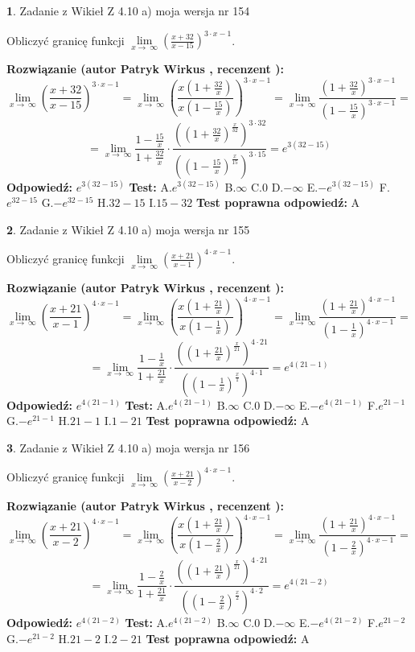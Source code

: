\documentclass[12pt, a4paper]{article}
\theoremstyle{definition} %
\newtheorem{zad}{}
\newcommand{\zadStart}[1]{\begin{zad}#1\newline}
\newcommand{\zadStop}{\end{zad}}
\newcommand{\rozwStart}[2]{\noindent \textbf{Rozwiązanie (autor #1 , recenzent #2): }\newline}
\newcommand{\rozwStop}{\newline}
\newcommand{\odpStart}{\noindent \textbf{Odpowiedź:}\newline}
\newcommand{\odpStop}{\newline}
\newcommand{\testStart}{\noindent \textbf{Test:}\newline}
\newcommand{\testStop}{\newline}
\newcommand{\kluczStart}{\noindent \textbf{Test poprawna odpowiedź:}\newline}
\newcommand{\kluczStop}{\newline}
\begin{document}
\zadStart{Zadanie z Wikieł Z 4.10 a) moja wersja nr 154}


Obliczyć granicę funkcji  $\lim\limits_{x\to\ \infty}(\frac{x+32}{x-15})^{3\cdot x-1}$.
\zadStop
\rozwStart{Patryk Wirkus}{}
$$\lim\limits_{x\to\ \infty}(\frac{x+32}{x-15})^{3\cdot x-1} = \lim\limits_{x\to\ \infty}(\frac{x(1+\frac{32}{x})}{x(1-\frac{15}{x})})^{3\cdot x-1}=\lim\limits_{x\to\ \infty}\frac{(1+\frac{32}{x})^{3\cdot x-1}}{(1-\frac{15}{x})^{3\cdot x-1}}=$$
$$=\lim\limits_{x\to\ \infty}\frac{1-\frac{15}{x}}{1+\frac{32}{x}}\cdot\frac{((1+\frac{32}{x})^{\frac{x}{32}})^{3\cdot32}}{((1-\frac{15}{x})^{\frac{x}{15}})^{3\cdot15}}=e^{3(32-15)}$$
\rozwStop
\odpStart
$e^{3(32-15)}$
\odpStop
\testStart
A.$e^{3(32-15)}$ B.$\infty$ C.$0$ D.$-\infty$ E.$-e^{3(32-15)}$
F.$e^{32-15}$ G.$-e^{32-15}$
H.$32-15$
I.$15-32$
\testStop
\kluczStart
A
\kluczStop



\zadStart{Zadanie z Wikieł Z 4.10 a) moja wersja nr 155}


Obliczyć granicę funkcji  $\lim\limits_{x\to\ \infty}(\frac{x+21}{x-1})^{4\cdot x-1}$.
\zadStop
\rozwStart{Patryk Wirkus}{}
$$\lim\limits_{x\to\ \infty}(\frac{x+21}{x-1})^{4\cdot x-1} = \lim\limits_{x\to\ \infty}(\frac{x(1+\frac{21}{x})}{x(1-\frac{1}{x})})^{4\cdot x-1}=\lim\limits_{x\to\ \infty}\frac{(1+\frac{21}{x})^{4\cdot x-1}}{(1-\frac{1}{x})^{4\cdot x-1}}=$$
$$=\lim\limits_{x\to\ \infty}\frac{1-\frac{1}{x}}{1+\frac{21}{x}}\cdot\frac{((1+\frac{21}{x})^{\frac{x}{21}})^{4\cdot21}}{((1-\frac{1}{x})^{\frac{x}{1}})^{4\cdot1}}=e^{4(21-1)}$$
\rozwStop
\odpStart
$e^{4(21-1)}$
\odpStop
\testStart
A.$e^{4(21-1)}$ B.$\infty$ C.$0$ D.$-\infty$ E.$-e^{4(21-1)}$
F.$e^{21-1}$ G.$-e^{21-1}$
H.$21-1$
I.$1-21$
\testStop
\kluczStart
A
\kluczStop



\zadStart{Zadanie z Wikieł Z 4.10 a) moja wersja nr 156}


Obliczyć granicę funkcji  $\lim\limits_{x\to\ \infty}(\frac{x+21}{x-2})^{4\cdot x-1}$.
\zadStop
\rozwStart{Patryk Wirkus}{}
$$\lim\limits_{x\to\ \infty}(\frac{x+21}{x-2})^{4\cdot x-1} = \lim\limits_{x\to\ \infty}(\frac{x(1+\frac{21}{x})}{x(1-\frac{2}{x})})^{4\cdot x-1}=\lim\limits_{x\to\ \infty}\frac{(1+\frac{21}{x})^{4\cdot x-1}}{(1-\frac{2}{x})^{4\cdot x-1}}=$$
$$=\lim\limits_{x\to\ \infty}\frac{1-\frac{2}{x}}{1+\frac{21}{x}}\cdot\frac{((1+\frac{21}{x})^{\frac{x}{21}})^{4\cdot21}}{((1-\frac{2}{x})^{\frac{x}{2}})^{4\cdot2}}=e^{4(21-2)}$$
\rozwStop
\odpStart
$e^{4(21-2)}$
\odpStop
\testStart
A.$e^{4(21-2)}$ B.$\infty$ C.$0$ D.$-\infty$ E.$-e^{4(21-2)}$
F.$e^{21-2}$ G.$-e^{21-2}$
H.$21-2$
I.$2-21$
\testStop
\kluczStart
A
\kluczStop
\end{document}
